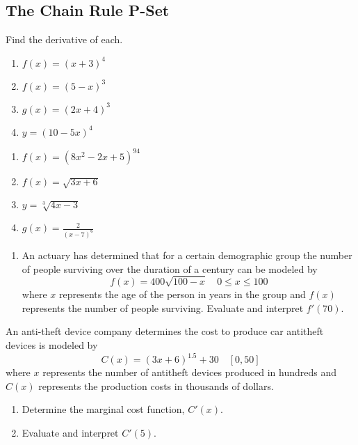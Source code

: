\documentclass{article}
\newcounter{pset}
\begin{document}
\subsection*{The Chain Rule P-Set}

Find the derivative of each.
\begin{multicols}{4}
\begin{enumerate}
    \item $f(x) = (x+3)^4$
    \item $f(x) = (5-x)^3$
    \item $g(x) = (2x+4)^3$
    \item $y = (10-5x)^4$
\end{enumerate}     \setcounter{pset}{\value{enumi}}
\end{multicols}
\begin{multicols}{4}
\begin{enumerate}   \setcounter{enumi}{\value{pset}}
    \item $f(x) = (8x^2-2x+5)^{94}$
    \item $f(x) = \sqrt{3x+6}$
    \item $y = \sqrt[3]{4x-3}$
    \item $g(x) = \frac{2}{(x-7)^6}$
\end{enumerate}     \setcounter{pset}{\value{enumi}}
\end{multicols}

\begin{enumerate}   \setcounter{enumi}{\value{pset}}
    \item An actuary has determined that for a certain demographic group the number of people surviving over the duration of a century can be modeled by
    \[
    f(x) = 400\sqrt{100-x}  \quad 0 \leq x \leq 100
    \]
    where $x$ represents the age of the person in years in the group and $f(x)$ represents the number of people surviving. Evaluate and interpret $f'(70)$.
\end{enumerate}     \setcounter{pset}{\value{enumi}}

An anti-theft device company determines the cost to produce car antitheft devices is modeled by
\[
C(x) = (3x+6)^{1.5} + 30 \quad [0,50]
\]
where $x$ represents the number of antitheft devices produced in hundreds and $C(x)$ represents the production costs in thousands of dollars.
\begin{enumerate}   \setcounter{enumi}{\value{pset}}
    \item Determine the marginal cost function, $C'(x)$.
    \item Evaluate and interpret $C'(5)$.
\end{enumerate}     \setcounter{pset}{\value{enumi}}
\end{document}
